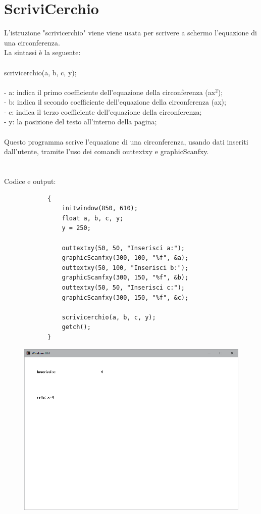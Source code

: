 \documentclass[12pt]{book}
\begin{document}
		\section{ScriviCerchio}
		L'istruzione "scrivicerchio" viene viene usata per scrivere a schermo l'equazione di una circonferenza.
		\\La sintassi è la seguente:
		\\
		\\
		\Large scrivicerchio(a, b, c, y);
		\normalsize
		\\
		\\- a: indica il primo coefficiente dell'equazione della circonferenza (ax$^2$);
		\\- b: indica il secondo coefficiente dell'equazione della circonferenza (ax);
		\\- c: indica il terzo coefficiente dell'equazione della circonferenza; 
		\\- y: la posizione del testo all'interno della pagina;
		\\
		\\Questo programma scrive l'equazione di una circonferenza, usando dati inseriti dall'utente, tramite l'uso dei comandi outtextxy e graphicScanfxy.
		\\ \\ \\
		Codice e output:
		\begin{lstlisting}
			{
				initwindow(850, 610);
				float a, b, c, y;
				y = 250;
				
				outtextxy(50, 50, "Inserisci a:");
				graphicScanfxy(300, 100, "%f", &a);
				outtextxy(50, 100, "Inserisci b:");
				graphicScanfxy(300, 150, "%f", &b);
				outtextxy(50, 50, "Inserisci c:");
				graphicScanfxy(300, 150, "%f", &c);
				
				scrivicerchio(a, b, c, y);
				getch();
			}
		\end{lstlisting}
	
		\begin{figure}[h]
			\includegraphics[scale=0.5]{scrivirettavertterminale1}
		\end{figure}
		\clearpage
\end{document}
